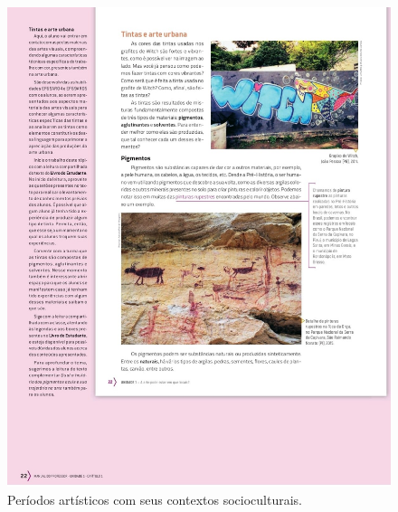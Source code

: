 \documentclass[portuguese]{textolivre}
\begin{document}
\begin{figure}[h!]
 \centering
 \begin{minipage}{.9\textwidth}
 \begin{minipage}{.45\textwidth}
 \includegraphics[width=\textwidth]{Imagem3.jpeg}
 \caption{Períodos artísticos com seus contextos socioculturais.}
 \label{fig3}
 \end{minipage}%
 \qquad
 \begin{minipage}{0.45\textwidth}

\end{minipage}
\end{minipage}
\end{figure}
\end{document}
